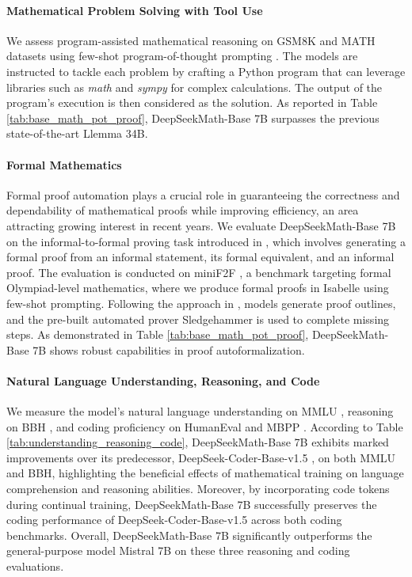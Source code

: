 \paragraph{Mathematical Problem Solving with Tool Use} We assess program-assisted mathematical reasoning on GSM8K and MATH datasets using few-shot program-of-thought prompting \citep{pot,pal}. The models are instructed to tackle each problem by crafting a Python program that can leverage libraries such as \textit{math} and \textit{sympy} for complex calculations. The output of the program's execution is then considered as the solution. As reported in Table \ref{tab:base_math_pot_proof}, DeepSeekMath-Base 7B surpasses the previous state-of-the-art Llemma 34B.

\paragraph{Formal Mathematics}

Formal proof automation plays a crucial role in guaranteeing the correctness and dependability of mathematical proofs while improving efficiency, an area attracting growing interest in recent years. We evaluate DeepSeekMath-Base 7B on the informal-to-formal proving task introduced in \citep{dsp_proof}, which involves generating a formal proof from an informal statement, its formal equivalent, and an informal proof. The evaluation is conducted on miniF2F \citep{minif2f}, a benchmark targeting formal Olympiad-level mathematics, where we produce formal proofs in Isabelle using few-shot prompting. Following the approach in \cite{dsp_proof}, models generate proof outlines, and the pre-built automated prover Sledgehammer \citep{sledgehammer} is used to complete missing steps. As demonstrated in Table \ref{tab:base_math_pot_proof}, DeepSeekMath-Base 7B shows robust capabilities in proof autoformalization.

\paragraph{Natural Language Understanding, Reasoning, and Code}

We measure the model’s natural language understanding on MMLU \citep{mmlu}, reasoning on BBH \citep{bbh}, and coding proficiency on HumanEval \citep{codex} and MBPP \citep{mbpp}. According to Table \ref{tab:understanding_reasoning_code}, DeepSeekMath-Base 7B exhibits marked improvements over its predecessor, DeepSeek-Coder-Base-v1.5 \citep{deepseek-coder}, on both MMLU and BBH, highlighting the beneficial effects of mathematical training on language comprehension and reasoning abilities. Moreover, by incorporating code tokens during continual training, DeepSeekMath-Base 7B successfully preserves the coding performance of DeepSeek-Coder-Base-v1.5 across both coding benchmarks. Overall, DeepSeekMath-Base 7B significantly outperforms the general-purpose model Mistral 7B \citep{mistral} on these three reasoning and coding evaluations.

